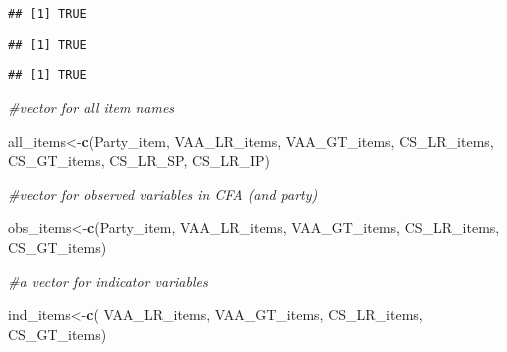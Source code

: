 \documentclass[
]{article}
\newenvironment{Shaded}{\begin{snugshade}}{\end{snugshade}}
\newcommand{\CommentTok}[1]{\textcolor[rgb]{0.56,0.35,0.01}{\textit{#1}}}
\newcommand{\KeywordTok}[1]{\textcolor[rgb]{0.13,0.29,0.53}{\textbf{#1}}}
\newcommand{\NormalTok}[1]{#1}
\newcommand{\OperatorTok}[1]{\textcolor[rgb]{0.81,0.36,0.00}{\textbf{#1}}}
\newcommand{\StringTok}[1]{\textcolor[rgb]{0.31,0.60,0.02}{#1}}
\begin{document}
\begin{verbatim}
## [1] TRUE
\end{verbatim}

\begin{Shaded}
\end{Shaded}

\begin{verbatim}
## [1] TRUE
\end{verbatim}

\begin{Shaded}
\end{Shaded}

\begin{verbatim}
## [1] TRUE
\end{verbatim}

\begin{Shaded}
\begin{Highlighting}[]
\CommentTok{#vector for all item names}

\NormalTok{all_items<-}\KeywordTok{c}\NormalTok{(Party_item,}
\NormalTok{             VAA_LR_items,}
\NormalTok{             VAA_GT_items,}
\NormalTok{             CS_LR_items,}
\NormalTok{             CS_GT_items,}
\NormalTok{             CS_LR_SP,}
\NormalTok{             CS_LR_IP)}

\CommentTok{#vector for observed variables in CFA (and party)}

\NormalTok{obs_items<-}\KeywordTok{c}\NormalTok{(Party_item,}
\NormalTok{             VAA_LR_items,}
\NormalTok{             VAA_GT_items,}
\NormalTok{             CS_LR_items,}
\NormalTok{             CS_GT_items)}

\CommentTok{#a vector for indicator variables}

\NormalTok{ind_items<-}\KeywordTok{c}\NormalTok{(}
\NormalTok{             VAA_LR_items,}
\NormalTok{             VAA_GT_items,}
\NormalTok{             CS_LR_items,}
\NormalTok{             CS_GT_items)}
\end{Highlighting}
\end{Shaded}
\end{document}
